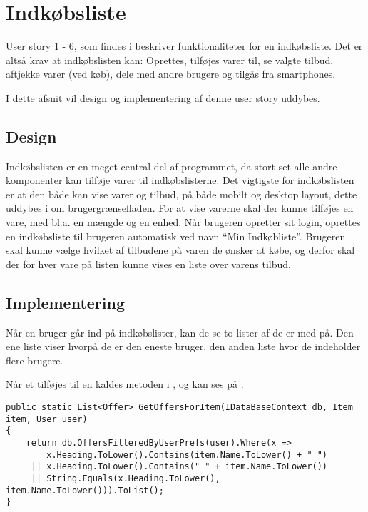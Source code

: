 \section{Indkøbsliste} \label{Indkoebsliste}
User story 1 - 6, som findes i  beskriver funktionaliteter for en indkøbsliste.
Det er altså krav at indkøbslisten kan: Oprettes, tilføjes varer til, se valgte tilbud, aftjekke varer (ved køb), dele med andre brugere og tilgås fra smartphones.

I dette afsnit vil design og implementering af denne user story uddybes.

\subsection{Design}

Indkøbslisten er en meget central del af programmet, da stort set alle andre komponenter kan tilføje varer til indkøbslisterne.
Det vigtigste for indkøbslisten er at den både kan vise varer og tilbud, på både mobilt og desktop layout, dette uddybes i  om brugergrænsefladen.
For at vise varerne skal der kunne tilføjes en vare, med bl.a. en mængde og en enhed.
Når brugeren opretter sit login, oprettes en indkøbsliste til brugeren automatisk ved navn ``Min Indkøbliste''.
Brugeren skal kunne vælge hvilket af tilbudene på varen de ønsker at købe, og derfor skal der for hver vare på listen kunne vises en liste over varens tilbud.


\subsection{Implementering}

Når en bruger går ind på indkøbslister, kan de se to lister af  de er med på.
Den ene liste viser  hvorpå de er den eneste bruger, den anden liste hvor de indeholder flere brugere.

Når et  tilføjes til en   kaldes metoden  i , og kan ses på .

\begin{lstlisting}[caption={Metoden \class{GetOffersForItem} finder relevante tilbud og returner dem som en liste}, label=getoffersforitem]
public static List<Offer> GetOffersForItem(IDataBaseContext db, Item item, User user)
{
    return db.OffersFilteredByUserPrefs(user).Where(x => 
     	x.Heading.ToLower().Contains(item.Name.ToLower() + " ") 
     || x.Heading.ToLower().Contains(" " + item.Name.ToLower()) 
     || String.Equals(x.Heading.ToLower(), item.Name.ToLower())).ToList();
}
\end{lstlisting}

